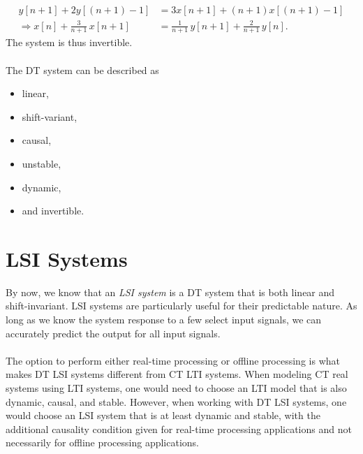 \documentclass{report}
\begin{document}
\begin{solution}
\begin{align*}
        y[n+1] + 2y[(n+1)-1] &= 3x[n+1] + (n+1)x[(n+1)-1] \\
        \Longrightarrow x[n] + \frac{3}{n+1}\,x[n+1] &= \frac{1}{n+1}\,y[n+1] + \frac{2}{n+1}\,y[n].
    \end{align*}
    The system is thus invertible.
    \\ \\
    The DT system can be described as 
    \begin{itemize}
        \item linear,
        \item shift-variant,
        \item causal,
        \item unstable,
        \item dynamic,
        \item and invertible.
    \end{itemize}
\end{solution}

\section{LSI Systems}
By now, we know that an \emph{LSI system} is a DT system that is both linear and shift-invariant. LSI systems are particularly useful for their predictable nature. 
As long as we know the system response to a few select input signals, we can accurately predict the output for all input signals.
\\ \\
The option to perform either real-time processing or offline processing is what makes DT LSI systems different from CT LTI systems. 
When modeling CT real systems using LTI systems, one would need to choose an LTI model that is also dynamic, causal, and stable. However, 
when working with DT LSI systems, one would choose an LSI system that is at least dynamic and stable, with the additional causality condition 
given for real-time processing applications and not necessarily for offline processing applications.
\end{document}
